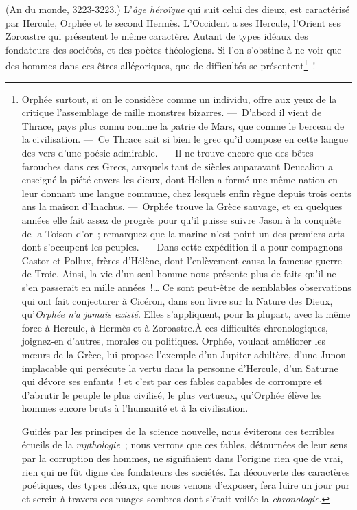 \documentclass[french,twoside]{book} %
\begin{document}
(An du monde, 3223-3223.) L’{\itshape âge héroïque} qui suit celui des dieux, est caractérisé par Hercule, Orphée et le second Hermès. L’Occident a ses Hercule, l’Orient ses Zoroastre qui présentent le même caractère. Autant de types idéaux des fondateurs des sociétés, et des poètes théologiens. Si l’on s’obstine à ne voir que des hommes dans ces êtres allégoriques, que de difficultés se présentent\footnote{\noindent Orphée surtout, si on le considère comme un individu, offre aux yeux de la critique l’assemblage de mille monstres bizarres. — D’abord il vient de Thrace, pays plus connu comme la patrie de Mars, que comme le berceau de la civilisation. — Ce Thrace sait si bien le grec qu’il compose en cette langue des vers d’une poésie admirable. — Il ne trouve encore que des bêtes farouches dans ces Grecs, auxquels tant de siècles auparavant Deucalion a enseigné la piété envers les dieux, dont Hellen a formé une même nation en leur donnant une langue commune, chez lesquels enfin règne depuis trois cents ans la maison d’Inachus. — Orphée trouve la Grèce sauvage, et en quelques années elle fait assez de progrès pour qu’il puisse suivre Jason à la conquête de la Toison d’or ; remarquez que la marine n’est point un des premiers arts dont s’occupent les peuples. — Dans cette expédition il a pour compagnons Castor et Pollux, frères d’Hélène, dont l’enlèvement causa la fameuse guerre de Troie. Ainsi, la vie d’un seul homme nous présente plus de faits qu’il ne s’en passerait en mille années !… Ce sont peut-être de semblables observations qui ont fait conjecturer à Cicéron, dans son livre sur la Nature des Dieux, qu’{\itshape Orphée n’a jamais existé}. Elles s’appliquent, pour la plupart, avec la même force à Hercule, à Hermès et à Zoroastre.À ces difficultés chronologiques, joignez-en d’autres, morales ou politiques. Orphée, voulant améliorer les mœurs de la Grèce, lui propose l’exemple d’un Jupiter adultère, d’une Junon implacable qui persécute la vertu dans la personne d’Hercule, d’un Saturne qui dévore ses enfants ! et c’est par ces fables capables de corrompre et d’abrutir le peuple le plus civilisé, le plus vertueux, qu’Orphée élève les hommes encore bruts à l’humanité et à la civilisation.\par
Guidés par les principes de la science nouvelle, nous éviterons ces terribles écueils de la {\itshape mythologie} ; nous verrons que ces fables, détournées de leur sens par la corruption des hommes, ne signifiaient dans l’origine rien que de vrai, rien qui ne fût digne des fondateurs des sociétés. La découverte des caractères poétiques, des types idéaux, que nous venons d’exposer, fera luire un jour pur et serein à travers ces nuages sombres dont s’était voilée la {\itshape chronologie}.
} !\par
\end{document}
